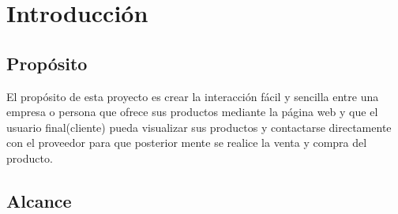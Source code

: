 \chapter{Introducción}

\section{Propósito}
 El propósito de esta proyecto es crear la interacción fácil y sencilla entre una empresa o persona que ofrece sus productos mediante la página web y que el usuario final(cliente) pueda visualizar sus productos y contactarse directamente con el proveedor para que posterior mente se realice la venta y compra del producto.

\section{Alcance}


